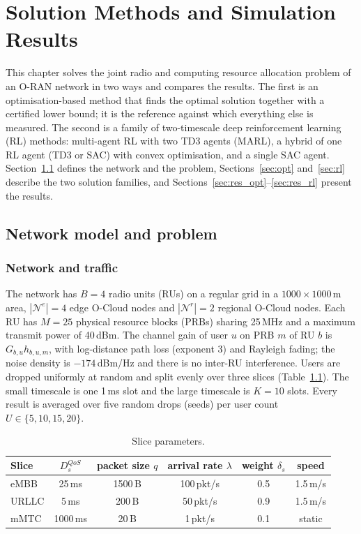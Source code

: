 \documentclass[11pt,oneside]{report}
\newcommand{\cN}{\mathcal{N}}
\begin{document}
\chapter{Solution Methods and Simulation Results}\label{ch:results}

This chapter solves the joint radio and computing resource allocation problem of an O-RAN network in two ways and compares the results.
The first is an optimisation-based method that finds the optimal solution together with a certified lower bound; it is the reference against which everything else is measured.
The second is a family of two-timescale deep reinforcement learning (RL) methods:
multi-agent RL with two TD3 agents (MARL),
a hybrid of one RL agent (TD3 or SAC) with convex optimisation,
and a single SAC agent.
Section~\ref{sec:setup} defines the network and the problem, Sections~\ref{sec:opt} and~\ref{sec:rl} describe the two solution families, and Sections~\ref{sec:res_opt}--\ref{sec:res_rl} present the results.

\section{Network model and problem}\label{sec:setup}

\subsection{Network and traffic}
The network has $B=4$ radio units (RUs) on a regular grid in a $1000\times1000$\,m area, $|\cN^e|=4$ edge O-Cloud nodes and $|\cN^r|=2$ regional O-Cloud nodes.
Each RU has $M=25$ physical resource blocks (PRBs) sharing 25\,MHz and a maximum transmit power of 40\,dBm.
The channel gain of user $u$ on PRB $m$ of RU $b$ is $G_{b,u}h_{b,u,m}$, with log-distance path loss (exponent 3) and Rayleigh fading; the noise density is $-174$\,dBm/Hz and there is no inter-RU interference.
Users are dropped uniformly at random and split evenly over three slices (Table~\ref{tab:slices}).
The small timescale is one 1\,ms slot and the large timescale is $K=10$ slots.
Every result is averaged over five random drops (seeds) per user count $U\in\{5,10,15,20\}$.

\begin{table}[H]
	\centering
	\caption{Slice parameters.}\label{tab:slices}
	\begin{tabular}{lccccc}
		\toprule
		Slice & $D_s^{QoS}$ & packet size $q$ & arrival rate $\lambda$ & weight $\delta_s$ & speed \\
		\midrule
		eMBB  & 25\,ms   & 1500\,B & 100\,pkt/s & 0.5 & 1.5\,m/s \\
		URLLC & 5\,ms    & 200\,B  & 50\,pkt/s  & 0.9 & 1.5\,m/s \\
		mMTC  & 1000\,ms & 20\,B   & 1\,pkt/s   & 0.1 & static \\
		\bottomrule
	\end{tabular}
\end{table}
\end{document}

